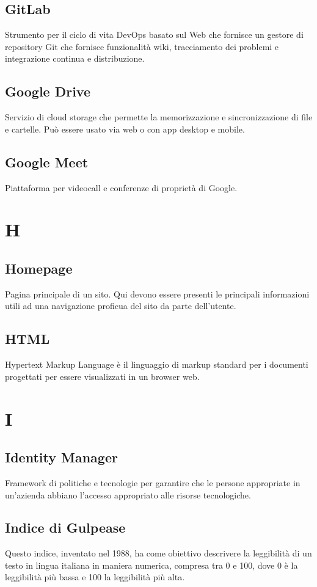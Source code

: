 \subsection*{GitLab}
Strumento per il ciclo di vita DevOps basato sul Web che fornisce un gestore di repository Git che fornisce funzionalità wiki, tracciamento dei problemi e integrazione continua e distribuzione.

\subsection*{Google Drive}
Servizio di cloud storage che permette la memorizzazione e sincronizzazione di file e cartelle. Può essere usato via web o con app desktop e mobile.

\subsection*{Google Meet}
Piattaforma per videocall e conferenze di proprietà di Google.

\section*{H}
\subsection*{Homepage}
Pagina principale di un sito. Qui devono essere presenti le principali informazioni utili ad una navigazione proficua del sito da parte dell'utente.

\subsection*{HTML}
Hypertext Markup Language è il linguaggio di markup standard per i documenti progettati per essere visualizzati in un browser web.

\section*{I}
\subsection*{Identity Manager}
Framework di politiche e tecnologie per garantire che le persone appropriate in un'azienda abbiano l'accesso appropriato alle risorse tecnologiche.

\subsection*{Indice di Gulpease}
Questo indice, inventato nel 1988, ha come obiettivo descrivere la leggibilità di un
testo in lingua italiana in maniera numerica, compresa tra 0 e 100, dove 0 è la leggibilità più
bassa e 100 la leggibilità più alta.

